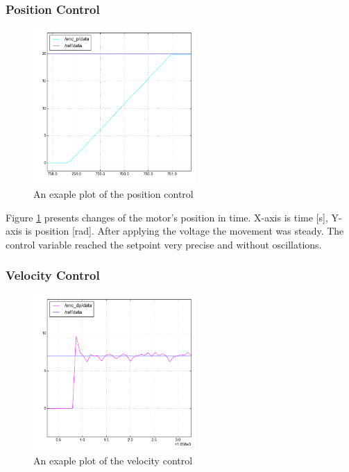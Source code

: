 \subsubsection{Position Control}
\begin{figure}%
 \begin{center} 
  \includegraphics[width=0.55\textwidth]{./stuff/enc_p_plot}
 \end{center}
 \caption{An exaple plot of the position control}
 \label{fig:position_plot} 
\end{figure} 

Figure \ref{fig:position_plot} presents changes of the motor's position in time. X-axis is time [s], Y-axis is position [rad]. After applying the voltage the movement was steady.
The control variable reached the setpoint very precise and without oscillations.

\subsubsection{Velocity Control}
\begin{figure}%
 \begin{center} 
  \includegraphics[width=0.55\textwidth]{./stuff/enc_dp_plot}
 \end{center}
 \caption{An exaple plot of the velocity control}
 \label{fig:velocity_plot} 
\end{figure} 

